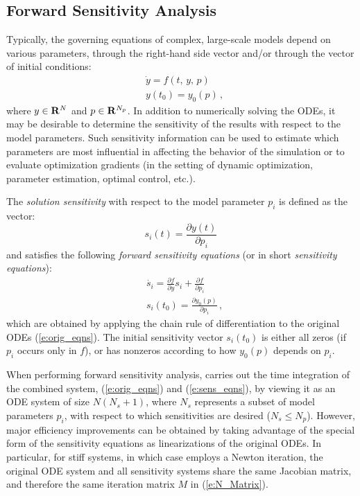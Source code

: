 \subsection{Forward Sensitivity Analysis}\label{ss:fwd_sensi}
Typically, the governing equations of complex, large-scale models
depend on various parameters,  through the right-hand side vector 
and/or through the vector of initial conditions:
\begin{equation}\label{e:orig_eqns}
\begin{split}
&\dot{y}  = f(t,\,y,\,p) \\
&y(t_0)  = y_0(p) \, ,
\end{split}
\end{equation}
where $y \in {\bf R}^N$ and $p \in {\bf R}^{N_p}$.
In addition to numerically solving the ODEs, it may be desirable to
determine the sensitivity of the results with respect to the model
parameters. 
Such sensitivity information can be used to estimate which
parameters are most influential in affecting the behavior of the
simulation or to evaluate optimization gradients (in the setting of dynamic
optimization, parameter estimation, optimal control, etc.).

The {\em solution sensitivity} with respect to the model parameter
$p_i$ is defined as the vector:
\begin{equation}
s_i (t) = \frac{\partial y(t)}{\partial p_i}
\end{equation}
and satisfies the following {\em forward sensitivity equations}
(or in short {\em sensitivity equations}):
\begin{equation}\label{e:sens_eqns}
\begin{split}
&\dot{s_i}  = \frac{\partial f}{\partial y} s_i + \frac{\partial f}{\partial p_i} \\
&s_i(t_0)  = \frac{\partial y_{0}(p)}{\partial p_i} \, ,
\end{split}
\end{equation}
which are obtained by applying the chain rule of differentiation to the original
ODEs (\ref{e:orig_eqns}). The initial sensitivity vector $s_i(t_0)$ is either all zeros 
(if $p_i$ occurs only in $f$), or has nonzeros according to how $y_{0}(p)$
depends on $p_{i}$.

When performing forward sensitivity analysis, {\cvodes} carries out the time integration 
of the combined system, (\ref{e:orig_eqns}) and (\ref{e:sens_eqns}), by viewing it as an ODE
system of size $N(N_s+1)$, where $N_s$ represents a subset of model parameters $p_i$, 
with respect to which sensitivities are desired ($N_s \le N_p$). 
However, major efficiency improvements can be obtained by taking advantage of the special 
form of the sensitivity equations as linearizations of the original ODEs. 
In particular, for stiff systems, in which case {\cvodes} employs a Newton iteration, 
the original ODE system and all sensitivity systems share the same Jacobian matrix, 
and therefore the same iteration matrix $M$ in (\ref{e:N_Matrix}).

